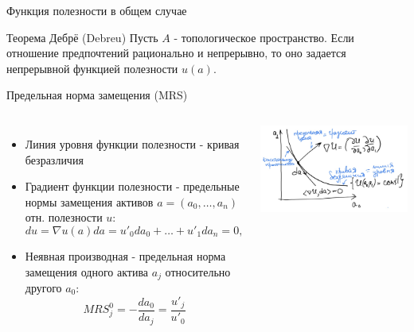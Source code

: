 \documentclass{beamer}
\begin{document}
\begin{frame}{Функция полезности в общем случае}
    \begin{block}{Теорема Дебрё (Debreu)}
Пусть $A$ - топологическое пространство. Если отношение предпочтений рационально и непрерывно, то оно задается непрерывной функцией полезности $u(a)$.
\end{block}
\end{frame}


\begin{frame}{Предельная норма замещения (MRS)}

\begin{columns}

    \begin{itemize}
        \item Линия уровня функции полезности - кривая безразличия
        \item Градиент функции полезности - предельные нормы замещения активов $a = (a_0,\ldots, a_n)$ отн. полезности $u$:
$$
du = \nabla u(a) da = u'_0 da_0 +\ldots+ u'_1 da_n = 0, 
$$
\item Неявная производная - предельная норма замещения одного актива $a_j$ относительно другого $a_0$:
$$
MRS^0_j =  -\frac{da_0}{da_j} = \frac{u'_j}{u'_0} 
$$
    \end{itemize}



        \includegraphics[width=1.0\textwidth]{2_figs/utility.jpeg}

\end{columns}


\end{frame}
\end{document}
